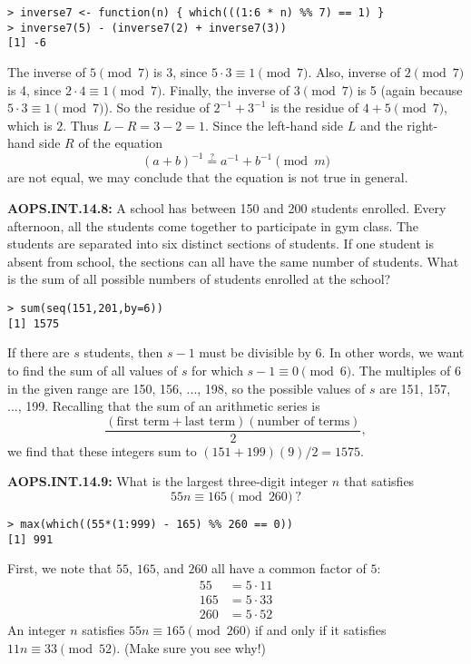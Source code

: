 \documentclass[11pt]{article}
\newenvironment{uzdevums}[1][\unskip]{%
\vspace{3mm}
\noindent
\textbf{#1:}
\noindent}
{}
\begin{document}
\begin{verbatim}
> inverse7 <- function(n) { which(((1:6 * n) %% 7) == 1) }
> inverse7(5) - (inverse7(2) + inverse7(3))
[1] -6
\end{verbatim}

The inverse of $5\pmod{7}$ is 3, since $5\cdot3 \equiv 1\pmod{7}$. Also, inverse of $2\pmod{7}$ is 4, since $2\cdot 4\equiv 1\pmod{7}$. Finally, the inverse of $3\pmod{7}$ is 5 (again because $5\cdot3 \equiv 1\pmod{7}$). So the residue of $2^{-1}+3^{-1}$ is the residue of $4+5\pmod{7}$, which is $2$. Thus $L-R=3-2=\boxed{1}$. Since the left-hand side $L$ and the right-hand side $R$ of the equation $$
(a+b)^{-1} \stackrel{?}{=} a^{-1} + b^{-1} \pmod{m}
$$are not equal, we may conclude that the equation is not true in general.

\begin{uzdevums}[AOPS.INT.14.8]
A school has between 150 and 200 students enrolled. Every afternoon, all the students come together to participate in gym class. The students are separated into six distinct sections of students. If one student is absent from school, the sections can all have the same number of students. What is the sum of all possible numbers of students enrolled at the school?
\end{uzdevums}

\begin{verbatim}
> sum(seq(151,201,by=6))
[1] 1575
\end{verbatim}

If there are $s$ students, then $s-1$ must be divisible by 6. In other words, we want to find the sum of all values of $s$ for which $s-1\equiv 0\pmod{6}$. The multiples of 6 in the given range are 150, 156, ..., 198, so the possible values of $s$ are 151, 157, ..., 199. Recalling that the sum of an arithmetic series is 
\[ \frac{(\text{first term}+\text{last term})(\text{number of terms})}{2}, \]
we find that these integers sum to $(151+199)(9)/2=\boxed{1575}$.

\begin{uzdevums}[AOPS.INT.14.9]
What is the largest three-digit integer $n$ that satisfies $$55n\equiv 165\pmod{260}~?$$
\end{uzdevums}

\begin{verbatim}
> max(which((55*(1:999) - 165) %% 260 == 0))
[1] 991
\end{verbatim}

First, we note that $55$, $165$, and $260$ all have a common factor of $5$: \begin{align*}
55 &= 5\cdot 11\\
165 &= 5\cdot 33\\
260 &= 5\cdot 52
\end{align*}An integer $n$ satisfies $55n\equiv 165\pmod{260}$ if and only if it satisfies $11n\equiv 33\pmod{52}$. (Make sure you see why!)
\end{document}
